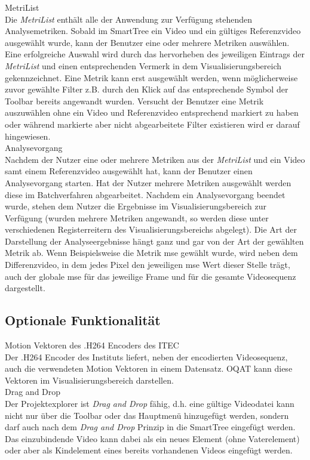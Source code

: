 %
 MetriList\\
Die \emph{MetriList} enthält alle der Anwendung zur Verfügung stehenden Analysemetriken.
Sobald im SmartTree ein Video und ein gültiges Referenzvideo ausgewählt wurde, kann der Benutzer
eine oder mehrere Metriken auswählen. Eine erfolgreiche Auswahl wird durch das hervorheben des
jeweiligen Eintrags der \emph{MetriList} und einen entsprechenden Vermerk in dem Visualisierungsbereich
gekennzeichnet. Eine Metrik kann erst ausgewählt werden, wenn möglicherweise zuvor gewählte Filter
z.B. durch den Klick auf das entsprechende Symbol der Toolbar bereits angewandt wurden. Versucht
der Benutzer eine Metrik auszuwählen ohne ein Video und Referenzvideo entsprechend markiert zu haben oder
während markierte aber nicht abgearbeitete Filter existieren wird er darauf hingewiesen.\\
 Analysevorgang \\
Nachdem der Nutzer eine oder mehrere Metriken aus der \emph{MetriList} und ein
Video samt einem Referenzvideo ausgewählt hat, kann der Benutzer einen Analysevorgang starten. Hat der
Nutzer mehrere Metriken ausgewählt werden diese im Batchverfahren abgearbeitet. Nachdem ein Analysevorgang
beendet wurde, stehen dem Nutzer die Ergebnisse im Visualisierungsbereich zur Verfügung (wurden 
mehrere Metriken angewandt, so werden diese unter verschiedenen Registerreitern des Visualisierungsbereichs
abgelegt). Die Art der Darstellung der Analyseergebnisse hängt ganz und gar von der Art der gewählten 
Metrik ab. Wenn Beispielsweise die Metrik \gls{mse} gewählt wurde, wird neben dem Differenzvideo, in dem jedes Pixel den jeweiligen \gls{mse} Wert dieser Stelle trägt, auch der globale \gls{mse} für das jeweilige Frame und für die gesamte Videosequenz dargestellt.

\subsection{Optionale Funktionalität}
\setcounter{counterKriterien}{0}
 Motion Vektoren des .H264 Encoders des \gls{ITEC}\\
Der .H264 Encoder des Instituts liefert, neben der encodierten Videosequenz, auch die verwendeten Motion
Vektoren in einem Datensatz. \gls{OQAT} kann diese Vektoren im Visualisierungsbereich darstellen.\\
 Drag and Drop\\
Der Projektexplorer ist \emph{Drag and Drop} fähig, d.h. eine gültige Videodatei kann nicht nur über
die Toolbar oder das Hauptmenü hinzugefügt werden, sondern darf auch nach dem \emph{Drag and Drop} Prinzip
in die SmartTree eingefügt werden. Das einzubindende Video kann dabei als ein neues Element (ohne
Vaterelement) oder aber als Kindelement eines bereits vorhandenen Videos eingefügt werden.
